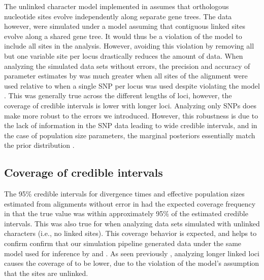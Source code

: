 The unlinked character model implemented in \ecoevolity assumes that orthologous 
nucleotide sites evolve independently along separate gene trees. The data however, were
simulated under a model assuming that contiguous linked sites evolve along a shared 
gene tree. It would thus be a violation of the \ecoevolity model to include all
sites in the analysis.
However, avoiding this violation by removing all but one variable site per
locus drastically reduces the amount of data.
When analyzing the simulated data sets without errors, the precision and accuracy of
parameter estimates by \ecoevolity was much greater
when all sites of the alignment were used relative to when a single SNP per 
locus was used despite violating the model \mainfigsp.
This was generally true across the different lengths of loci, however, the
coverage of credible intervals is lower with longer loci.
Analyzing only SNPs does make \ecoevolity more robust to the errors
we introduced.
However, this robustness is due to the lack of information in the
SNP data leading to wide credible intervals, and in the case of
population size parameters, the marginal posteriors essentially
match the prior distribution \thetafigsp.





\subsection{Coverage of credible intervals}
The 95\% credible intervals for divergence times and effective population sizes
estimated from alignments without error in \beast had the expected coverage
frequency in that the true value was within approximately 95\% of the estimated
credible intervals. 
This was also true for \ecoevolity when analyzing data sets simulated with
unlinked characters (i.e., no linked sites).
This coverage behavior is expected, and helps to confirm confirm that our
simulation pipeline generated data under the same model used for inference by
\beast and \ecoevolity. 
As seen previously \parencite{oaksFullBayesianComparative2019}, analyzing longer linked loci
causes the coverage of \ecoevolity to be lower, due to the violation of the
model's assumption that the sites are unlinked.

